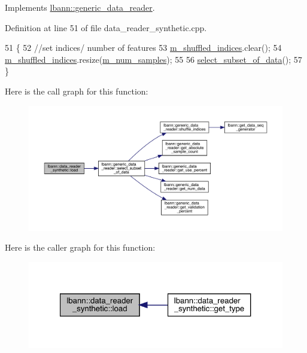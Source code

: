 Implements \hyperlink{classlbann_1_1generic__data__reader_afeb47703d988a230a59859cbfc178215}{lbann\+::generic\+\_\+data\+\_\+reader}.



Definition at line 51 of file data\+\_\+reader\+\_\+synthetic.\+cpp.


\begin{DoxyCode}
51                                  \{
52   \textcolor{comment}{//set indices/ number of features}
53   \hyperlink{classlbann_1_1generic__data__reader_aaab6aeff67ffff1c689336851fec2c57}{m\_shuffled\_indices}.clear();
54   \hyperlink{classlbann_1_1generic__data__reader_aaab6aeff67ffff1c689336851fec2c57}{m\_shuffled\_indices}.resize(\hyperlink{classlbann_1_1data__reader__synthetic_aa71d4bc62be7cf93eb6e85abf82d6b1f}{m\_num\_samples});
55 
56   \hyperlink{classlbann_1_1generic__data__reader_aa28fdeeb6af492540f507e49adff5d6c}{select\_subset\_of\_data}();
57 \}
\end{DoxyCode}
Here is the call graph for this function\+:\nopagebreak
\begin{figure}[H]
\begin{center}
\leavevmode
\includegraphics[width=350pt]{classlbann_1_1data__reader__synthetic_a0c57b7ff8fcb0c700fd412a9ee29dc28_cgraph}
\end{center}
\end{figure}
Here is the caller graph for this function\+:\nopagebreak
\begin{figure}[H]
\begin{center}
\leavevmode
\includegraphics[width=321pt]{classlbann_1_1data__reader__synthetic_a0c57b7ff8fcb0c700fd412a9ee29dc28_icgraph}
\end{center}
\end{figure}
\mbox{\label{classlbann_1_1data__reader__synthetic_a7507d28c3a06b11e0abc90facf31924a}} 
